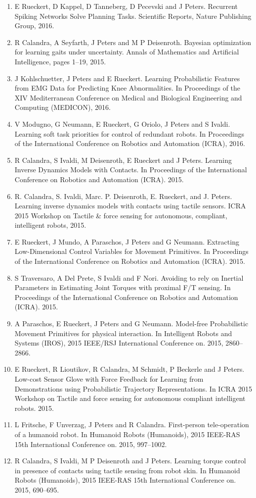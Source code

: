 \begin{enumerate}
\item E Rueckert, D Kappel, D Tanneberg, D Pecevski and J Peters. Recurrent Spiking Networks Solve Planning Tasks. Scientific Reports, Nature Publishing Group, 2016.
\item R Calandra, A Seyfarth, J Peters and M P Deisenroth. Bayesian optimization for learning gaits under uncertainty. Annals of Mathematics and Artificial Intelligence, pages 1–19, 2015.
\item J Kohlschuetter, J Peters and E Rueckert. Learning Probabilistic Features from EMG Data for Predicting Knee Abnormalities. In Proceedings of the XIV Mediterranean Conference on Medical and Biological Engineering and Computing (MEDICON), 2016.
\item V Modugno, G Neumann, E Rueckert, G Oriolo, J Peters and S Ivaldi. Learning soft task priorities for control of redundant robots. In Proceedings of the International Conference on Robotics and Automation (ICRA), 2016.
\item R Calandra, S Ivaldi, M Deisenroth, E Rueckert and J Peters. Learning Inverse Dynamics Models with Contacts. In Proceedings of the International Conference on Robotics and Automation (ICRA). 2015.
\item R. Calandra, S. Ivaldi, Marc. P. Deisenroth, E. Rueckert, and J. Peters. Learning inverse dynamics models with contacts using tactile sensors. ICRA 2015 Workshop on Tactile \& force sensing for autonomous, compliant, intelligent robots, 2015.
\item E Rueckert, J Mundo, A Paraschos, J Peters and G Neumann. Extracting Low-Dimensional Control Variables for Movement Primitives. In Proceedings of the International Conference on Robotics and Automation (ICRA). 2015. 
\item S Traversaro, A Del Prete, S Ivaldi and F Nori. Avoiding to rely on Inertial Parameters in Estimating Joint Torques with proximal F/T sensing. In Proceedings of the International Conference on Robotics and Automation (ICRA). 2015.
\item A Paraschos, E Rueckert, J Peters and G Neumann. Model-free Probabilistic Movement Primitives for physical interaction. In Intelligent Robots and Systems (IROS), 2015 IEEE/RSJ International Conference on. 2015, 2860–2866. 
\item E Rueckert, R Lioutikov, R Calandra, M Schmidt, P Beckerle and J Peters. Low-cost Sensor Glove with Force Feedback for Learning from Demonstrations using Probabilistic Trajectory Representations. In ICRA 2015 Workshop on Tactile and force sensing for autonomous compliant intelligent robots. 2015.
\item L Fritsche, F Unverzag, J Peters and R Calandra. First-person tele-operation of a humanoid robot. In Humanoid Robots (Humanoids), 2015 IEEE-RAS 15th International Conference on. 2015, 997–1002.
\item R Calandra, S Ivaldi, M P Deisenroth and J Peters. Learning torque control in presence of contacts using tactile sensing from robot skin. In Humanoid Robots (Humanoids), 2015 IEEE-RAS 15th International Conference on. 2015, 690–695.
\end{enumerate}

